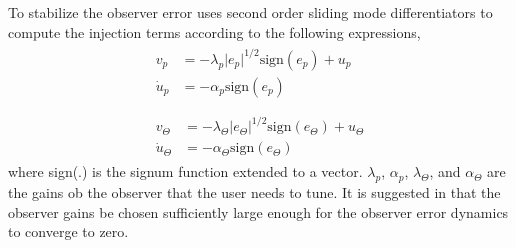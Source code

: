 \documentclass[letterpaper%
, twoside%
, 12pt%
,memoire%
, english%
,creativecommons,hyperref%
]{thETS}
\theoremstyle{newThmStyle}
\begin{document}
To stabilize the observer error \citep{bash2019analysis} uses second order sliding mode differentiators to compute the injection terms \citep{levant1998robust} according to the following expressions, 
\begin{subequations}
\label{sto}
\begin{align}
\begin{split}\label{eqn:STO5}
v_p&=-\lambda_p \vert e_p \vert ^{1/2}\text{sign}(e_p)+u_p \\
\dot{u}_p&=-\alpha_p \text{sign}(e_p)
\end{split}\\ \nonumber\\
\begin{split}\label{eqn:STO6} 
v_\Theta&=-\lambda_\Theta \vert e_\Theta \vert ^{1/2}\text{sign}(e_\Theta)+u_\Theta \\
\dot{u}_\Theta&=-\alpha_\Theta \text{sign}(e_\Theta)
\end{split}
\end{align}
\end{subequations}
where sign(.) is the signum function extended to a vector. $\lambda_p$, $\alpha_p$, $\lambda_\Theta$, and $\alpha_\Theta$ are the gains ob the observer that the user needs to tune. It is suggested in \citep{levant1998robust} that the observer gains be chosen sufficiently large enough for the observer error dynamics to converge to zero. 
\end{document}
